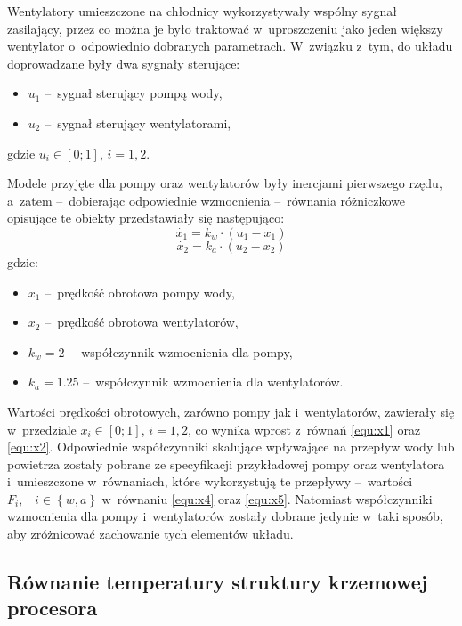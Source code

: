 Wentylatory umieszczone na chłodnicy wykorzystywały wspólny sygnał zasilający,
przez co można je było traktować w~uproszczeniu jako jeden większy wentylator
o~odpowiednio dobranych parametrach. W~związku z~tym, do układu doprowadzane
były dwa sygnały sterujące:
\begin{itemize}
    \item $u_1$ --~sygnał sterujący pompą wody,
    \item $u_2$ --~sygnał sterujący wentylatorami,
\end{itemize}
gdzie $u_i \in \left[ 0; 1 \right]$, $i = 1, 2$.

Modele przyjęte dla pompy oraz wentylatorów były inercjami pierwszego rzędu,
a~zatem --~dobierając odpowiednie wzmocnienia --~równania różniczkowe opisujące
te obiekty przedstawiały się następująco:
\begin{equation}
    \dot{x_1} = k_w \cdot \left( u_1 - x_1 \right)
    \label{equ:x1}
\end{equation}
\begin{equation}
    \dot{x_2} = k_a \cdot \left( u_2 - x_2 \right)
    \label{equ:x2}
\end{equation}
gdzie:
\begin{itemize}
    \item $x_1$ --~prędkość obrotowa pompy wody,
    \item $x_2$ --~prędkość obrotowa wentylatorów,
    \item $k_w = 2$ --~współczynnik wzmocnienia dla pompy,
    \item $k_a = 1.25$ --~współczynnik wzmocnienia dla wentylatorów.
\end{itemize}

Wartości prędkości obrotowych, zarówno pompy jak i~wentylatorów, zawierały się
w~przedziale $x_i \in \left[ 0; 1 \right]$, $i = 1, 2$, co wynika wprost
z~równań \eqref{equ:x1} oraz \eqref{equ:x2}. Odpowiednie współczynniki
skalujące wpływające na przepływ wody lub powietrza zostały pobrane ze
specyfikacji przykładowej pompy \cite{EKWBpump} oraz wentylatora \cite{EKWBfan}
i~umieszczone w~równaniach, które wykorzystują te przepływy --~wartości $F_i
\text{,} \quad i \in \left\{ w, a \right\}$ w~równaniu \eqref{equ:x4} oraz
\eqref{equ:x5}. Natomiast współczynniki wzmocnienia dla pompy i~wentylatorów
zostały dobrane jedynie w~taki sposób, aby zróżnicować zachowanie tych elementów
układu.

\subsection{Równanie temperatury struktury krzemowej procesora}
\indent

